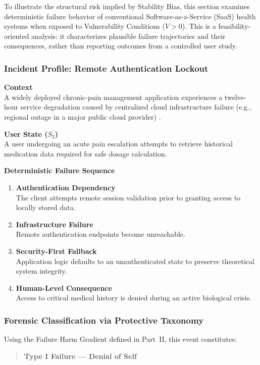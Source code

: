 \documentclass[12pt]{article}
\begin{document}
To illustrate the structural risk implied by Stability Bias, this section examines deterministic failure behavior of conventional Software-as-a-Service (SaaS) health systems when exposed to Vulnerability Conditions ($V > 0$). This is a feasibility-oriented analysis: it characterizes plausible failure trajectories and their consequences, rather than reporting outcomes from a controlled user study.

\subsubsection{Incident Profile: Remote Authentication Lockout}
\textbf{Context}\\
A widely deployed chronic-pain management application experiences a twelve-hour service degradation caused by centralized cloud infrastructure failure (e.g., regional outage in a major public cloud provider) \cite{aws2017s3outage}.

\textbf{User State ($S_2$)}\\
A user undergoing an acute pain escalation attempts to retrieve historical medication data required for safe dosage calculation.

\textbf{Deterministic Failure Sequence}
\begin{enumerate}
\item \textbf{Authentication Dependency}\\
   The client attempts remote session validation prior to granting access to locally stored data.
\item \textbf{Infrastructure Failure}\\
   Remote authentication endpoints become unreachable.
\item \textbf{Security-First Fallback}\\
   Application logic defaults to an unauthenticated state to preserve theoretical system integrity.
\item \textbf{Human-Level Consequence}\\
   Access to critical medical history is denied during an active biological crisis.
\end{enumerate}

\subsubsection{Forensic Classification via Protective Taxonomy}
Using the Failure Harm Gradient defined in Part~II, this event constitutes:

\begin{quote}
\textbf{Type I Failure --- Denial of Self}
\end{quote}
\end{document}
